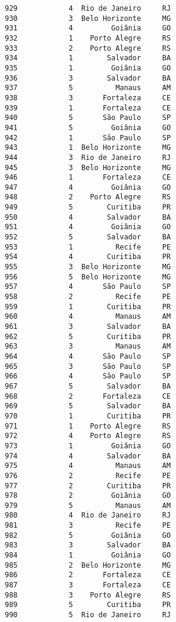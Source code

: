 \documentclass[11pt]{article}
\begin{document}
\begin{Verbatim}[commandchars=\\\{\}]
929            4  Rio de Janeiro     RJ  
930            3  Belo Horizonte     MG  
931            4         Goiânia     GO  
932            1    Porto Alegre     RS  
933            2    Porto Alegre     RS  
934            1        Salvador     BA  
935            1         Goiânia     GO  
936            3        Salvador     BA  
937            5          Manaus     AM  
938            3       Fortaleza     CE  
939            1       Fortaleza     CE  
940            5       São Paulo     SP  
941            5         Goiânia     GO  
942            1       São Paulo     SP  
943            1  Belo Horizonte     MG  
944            3  Rio de Janeiro     RJ  
945            3  Belo Horizonte     MG  
946            1       Fortaleza     CE  
947            4         Goiânia     GO  
948            2    Porto Alegre     RS  
949            5        Curitiba     PR  
950            4        Salvador     BA  
951            4         Goiânia     GO  
952            5        Salvador     BA  
953            1          Recife     PE  
954            4        Curitiba     PR  
955            3  Belo Horizonte     MG  
956            5  Belo Horizonte     MG  
957            4       São Paulo     SP  
958            2          Recife     PE  
959            1        Curitiba     PR  
960            4          Manaus     AM  
961            3        Salvador     BA  
962            5        Curitiba     PR  
963            3          Manaus     AM  
964            4       São Paulo     SP  
965            3       São Paulo     SP  
966            4       São Paulo     SP  
967            5        Salvador     BA  
968            2       Fortaleza     CE  
969            5        Salvador     BA  
970            1        Curitiba     PR  
971            1    Porto Alegre     RS  
972            4    Porto Alegre     RS  
973            1         Goiânia     GO  
974            4        Salvador     BA  
975            4          Manaus     AM  
976            2          Recife     PE  
977            2        Curitiba     PR  
978            2         Goiânia     GO  
979            5          Manaus     AM  
980            4  Rio de Janeiro     RJ  
981            3          Recife     PE  
982            5         Goiânia     GO  
983            3        Salvador     BA  
984            1         Goiânia     GO  
985            2  Belo Horizonte     MG  
986            2       Fortaleza     CE  
987            3       Fortaleza     CE  
988            3    Porto Alegre     RS  
989            5        Curitiba     PR  
990            5  Rio de Janeiro     RJ  

\end{Verbatim}
\end{document}
